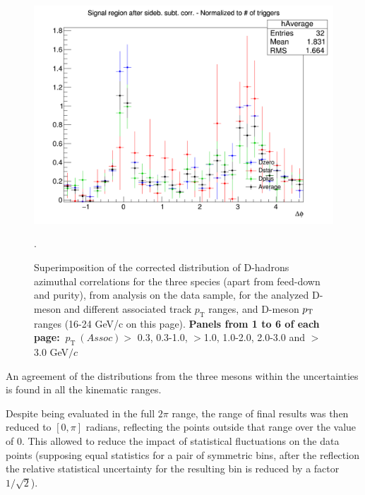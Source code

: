 \begin{figure}
{\includegraphics[width=0.48\linewidth]{figures/Averages/AzimCorrDistr_Canvas_PtIntBins16to24_PoolInt_thr3dotto99dot_Superimp.png}}
\caption{Superimposition of the corrected distribution of D-hadrons azimuthal correlations for the three species (apart from feed-down and purity), from analysis on the data sample, for the analyzed D-meson and different associated track $p_\text{T}$ ranges, and D-meson $p_{\rm T}$ ranges (16-24 GeV/c on this page). \textbf{Panels from 1 to 6 of each page:} $ \ p_\text{T}~(Assoc)>$ 0.3, 0.3-1.0, $>$1.0, 1.0-2.0, 2.0-3.0 and $>$3.0 GeV$/c$}.
\label{fig:Data_Res_D0DpDs4}
\end{figure}

An agreement of the distributions from the three mesons within the uncertainties is found in all the kinematic ranges.

Despite being evaluated in the full $2\pi$ range, the range of final results was then reduced to $[0,\pi]$ radians, reflecting the points outside that range over the value of 0. This allowed to reduce the impact of statistical fluctuations on the data points (supposing equal statistics for a pair of symmetric bins, after the reflection the relative statistical uncertainty for the resulting bin is reduced by a factor $1/\sqrt{2}$).




